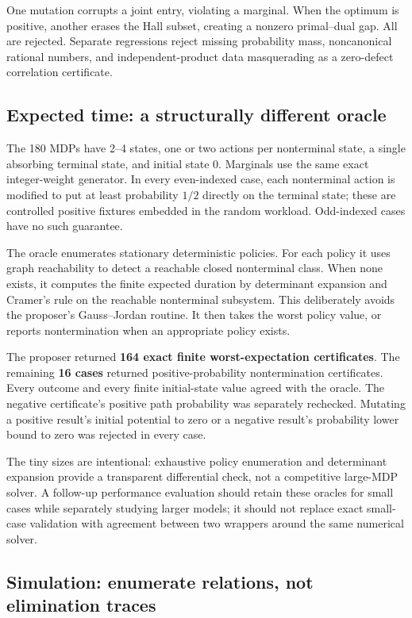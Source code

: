 One mutation corrupts a joint entry, violating a marginal. When the optimum is
positive, another erases the Hall subset, creating a nonzero primal--dual gap.
All are rejected. Separate regressions reject missing probability mass,
noncanonical rational numbers, and independent-product data masquerading as a
zero-defect correlation certificate.

\subsection{Expected time: a structurally different oracle}

The 180 MDPs have 2--4 states, one or two actions per nonterminal state, a single
absorbing terminal state, and initial state 0. Marginals use the same exact
integer-weight generator. In every even-indexed case, each nonterminal action
is modified to put at least probability $1/2$ directly on the terminal state;
these are controlled positive fixtures embedded in the random workload.
Odd-indexed cases have no such guarantee.

The oracle enumerates stationary deterministic policies. For each policy it
uses graph reachability to detect a reachable closed nonterminal class. When
none exists, it computes the finite expected duration by determinant expansion
and Cramer's rule on the reachable nonterminal subsystem. This deliberately
avoids the proposer's Gauss--Jordan routine. It then takes the worst policy
value, or reports nontermination when an appropriate policy exists.

The proposer returned \textbf{164 exact finite worst-expectation certificates}.
The remaining \textbf{16 cases} returned positive-probability nontermination
certificates. Every
outcome and every finite initial-state value agreed with the oracle. The
negative certificate's positive path probability was separately rechecked.
Mutating a positive result's initial potential to zero or a negative result's
probability lower bound to zero was rejected in every case.

The tiny sizes are intentional: exhaustive policy enumeration and determinant
expansion provide a transparent differential check, not a competitive
large-MDP solver. A follow-up performance evaluation should retain these
oracles for small cases while separately studying larger models; it should not
replace exact small-case validation with agreement between two wrappers around
the same numerical solver.

\subsection{Simulation: enumerate relations, not elimination traces}

